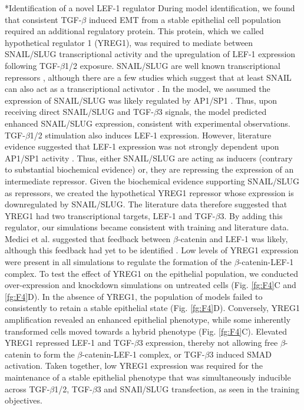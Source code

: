 \documentclass[12pt]{article}
\makeatletter
\renewcommand\subsection{\@startsection
	{subsection}{2}{0mm}
	{-0.05in}
	{-0.5\baselineskip}
	{\normalfont\normalsize\bfseries}}
\makeatother
\begin{document}
\subsection*{Identification of a novel LEF-1 regulator}
During model identification, we found that consistent TGF-$\beta$ induced EMT from a stable epithelial cell population required an additional regulatory protein.
This protein, which we called hypothetical regulator 1 (YREG1), was required to mediate between SNAIL/SLUG transcriptional activity
and the upregulation of LEF-1 expression following TGF-$\beta$1/2 exposure.
SNAIL/SLUG are well known transcriptional repressors \citep{Hemavathy:2000aa,Hemavathy:2000ab,Dhasarathy:2011aa}, although there are a few studies
which suggest that at least SNAIL can also act as a transcriptional activator \citep{Guaita:2002aa}.
In the model, we assumed the expression of SNAIL/SLUG was likely regulated by AP1/SP1 \citep{Jackstadt:2013aa}.
Thus, upon receiving direct SNAIL/SLUG and TGF-$\beta$3 signals, the model predicted enhanced SNAIL/SLUG expression, consistent with experimental observations.
TGF-$\beta$1/2 stimulation also induces LEF-1 expression. However, literature evidence suggested that LEF-1 expression was not strongly dependent upon AP1/SP1 activity \citep{Eastman:1999aa}.
Thus, either SNAIL/SLUG are acting as inducers (contrary to substantial biochemical evidence) or, they are repressing the expression of an intermediate repressor.
Given the biochemical evidence supporting SNAIL/SLUG as repressors, we created the hypothetical YREG1 repressor whose
expression is downregulated by SNAIL/SLUG. The literature data therefore suggested that YREG1 had two transcriptional targets, LEF-1 and TGF-$\beta$3.
By adding this regulator, our simulations became consistent with training and literature data.
Medici et al. suggested that feedback between $\beta$-catenin and LEF-1 was likely, although this feedback had yet to be identified \citep{Medici:2008fk}.
Low levels of YREG1 expression were present in all simulations to regulate the formation of the $\beta$-catenin-LEF-1 complex.
To test the effect of YREG1 on the epithelial population, we conducted over-expression and knockdown simulations on untreated cells (Fig. \ref{fg:F4}C and \ref{fg:F4}D).
In the absence of YREG1, the population of models failed to consistently to retain a stable epithelial state (Fig. \ref{fg:F4}D).
Conversely, YREG1 amplification revealed an enhanced epithelial phenotype, while some inherently transformed cells moved towards a hybrid phenotype  (Fig. \ref{fg:F4}C).
Elevated YREG1 repressed LEF-1 and TGF-$\beta$3 expression, thereby not allowing free $\beta$-catenin to form the $\beta$-catenin-LEF-1 complex, or TGF-$\beta$3 induced SMAD activation.
Taken together, low YREG1 expression was required for the maintenance of a stable epithelial phenotype that was simultaneously inducible across TGF-$\beta$1/2, TGF-$\beta$3 and SNAIl/SLUG transfection, as seen in the training objectives.
\end{document}
